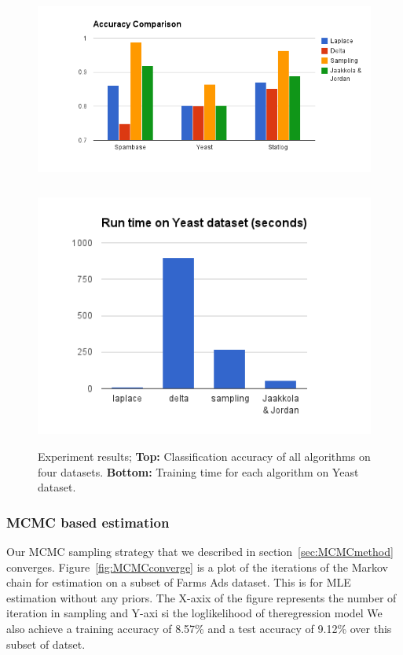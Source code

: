 \begin{figure}[t]
\label{fig:results}
\centering
\includegraphics[height=7.0cm]{results/accuracy_comp.png}
\includegraphics[height=8.0cm]{results/speed_comp.png}

\caption{\small Experiment results; {\bf Top:} Classification accuracy of all algorithms on
four datasets. {\bf Bottom:} Training time for each algorithm on Yeast dataset. }

\label{graphlab}
\end{figure}

\subsubsection{MCMC based estimation}
Our MCMC sampling strategy that we described in section~\ref{sec:MCMCmethod}
converges. Figure~\ref{fig:MCMCconverge} is a plot of the iterations of the Markov 
chain for estimation on a subset of Farms Ads dataset. This is for MLE
estimation without any priors. The X-axix of the figure represents the number of
iteration in sampling and Y-axi si the loglikelihood of theregression model We
also achieve a training accuracy of 8.57\% and a test accuracy of 9.12\% over 
this subset of datset. 

